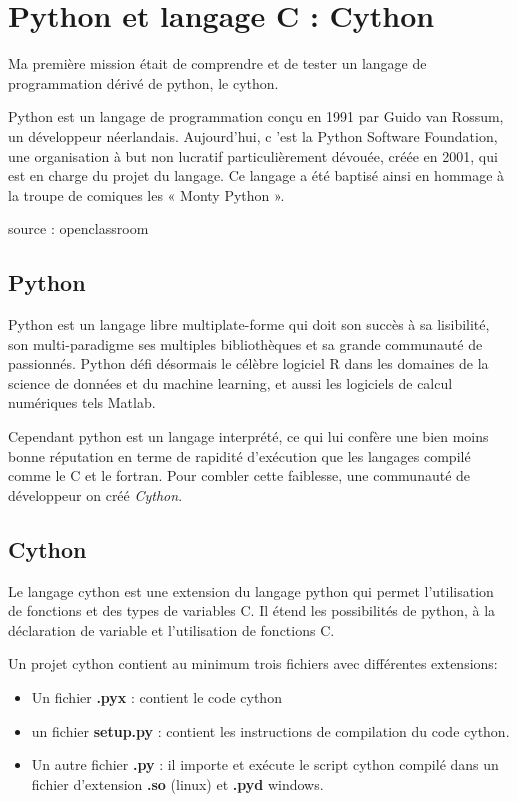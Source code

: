 \chapter{Python et langage C : Cython} 

Ma première mission était de comprendre et de tester un langage de programmation dérivé de python, le cython.

Python est un langage de programmation conçu en 1991 par Guido van Rossum, un développeur néerlandais. Aujourd'hui, c 'est la Python Software Foundation, une organisation à but non lucratif particulièrement dévouée, créée en 2001, qui est en charge du projet du langage. Ce langage a été baptisé ainsi en hommage à la troupe de comiques les « Monty Python ».

source : openclassroom

\section{Python}

Python est un langage libre multiplate-forme qui doit son succès à sa lisibilité, son multi-paradigme ses multiples bibliothèques et sa grande communauté de passionnés. Python défi désormais le célèbre logiciel R dans les domaines de la science de données et du machine learning, et aussi les logiciels de calcul numériques tels Matlab.

Cependant python est un langage interprété, ce qui lui confère une bien moins bonne réputation en terme de rapidité d'exécution que les langages compilé comme le C et le fortran. Pour combler cette faiblesse, une communauté de développeur on créé \emph{Cython}.

\section{Cython}

Le langage cython est une extension du langage python qui permet l'utilisation de fonctions et des types de variables C. Il étend les possibilités de python, à la déclaration de variable et l'utilisation de fonctions C.

Un projet cython contient au minimum trois fichiers avec différentes extensions:
\begin{itemize}
\item Un fichier \textbf{.pyx} :  contient le code cython
\item un fichier \textbf{setup.py} :  contient les instructions de compilation du code cython.
\item Un autre fichier \textbf{.py} :  il importe et exécute le script cython compilé dans un fichier d'extension \textbf{.so} (linux) et \textbf{.pyd} windows.
\end{itemize}

